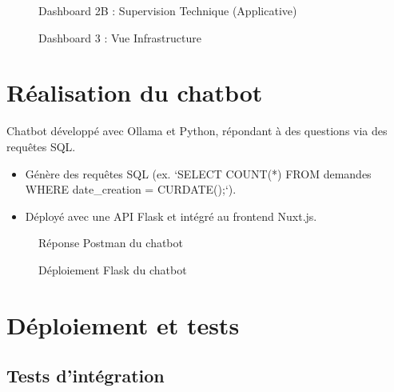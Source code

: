 \begin{figure}[h]
    \centering
    \caption{Dashboard 2B : Supervision Technique (Applicative)}
    \label{fig:dashboard2b}
\end{figure}

\begin{figure}[h]
    \centering
    \caption{Dashboard 3 : Vue Infrastructure}
    \label{fig:dashboard3}
\end{figure}

\section{Réalisation du chatbot}

Chatbot développé avec Ollama et Python, répondant à des questions via des requêtes SQL.

\begin{itemize}
    \item Génère des requêtes SQL (ex. `SELECT COUNT(*) FROM demandes WHERE date_creation = CURDATE();`).
    \item Déployé avec une API Flask et intégré au frontend Nuxt.js.
\end{itemize}

\begin{figure}[h]
    \centering
    \caption{Réponse Postman du chatbot}
    \label{fig:postman_response}
\end{figure}

\begin{figure}[h]
    \centering
    \caption{Déploiement Flask du chatbot}
    \label{fig:chat_flask}
\end{figure}

\section{Déploiement et tests}

\subsection{Tests d’intégration}

